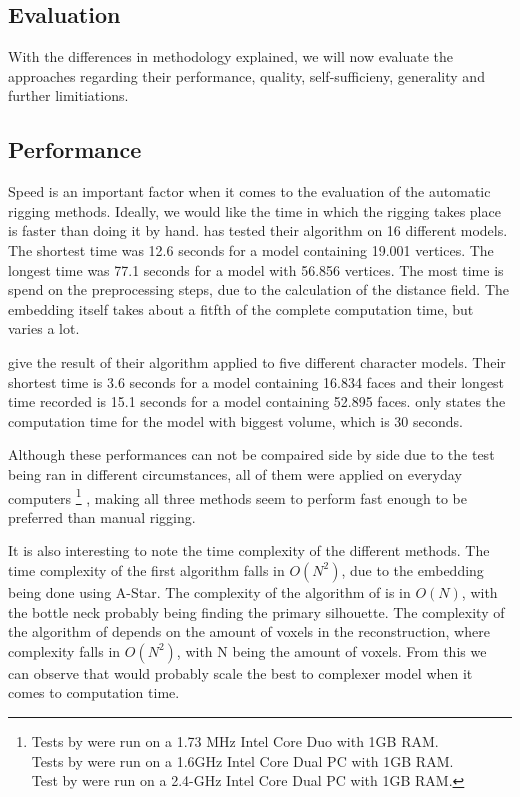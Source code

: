 \documentclass{article}
\begin{document}



\subsection{Evaluation}
With the differences in methodology explained, we will now evaluate the
approaches regarding their performance, quality, self-sufficieny, generality and
further limitiations.

\subsection{Performance}
Speed is an important factor when it comes to the evaluation of the automatic rigging
methods. Ideally, we would like the time in which the rigging takes place is
faster than doing it by hand. \citep{paper1} has tested their algorithm on 16
different models. The shortest time was 12.6 seconds for a model containing 19.001
vertices. The longest time was 77.1 seconds for a model with 56.856 vertices.
The most time is spend on the preprocessing steps, due to the calculation of the
distance field. The embedding itself takes about a fitfth of the complete
computation time, but varies a lot.

\citep{paper2} give the result of their algorithm applied to five different
character models. Their shortest time is 3.6 seconds for a model containing
16.834 faces and their longest time recorded is 15.1 seconds for a model
containing 52.895 faces.
\citep{paper3} only states the computation time for the model with biggest
volume, which is 30 seconds.

Although these performances can not be compaired side by side due to the test
being ran in different circumstances, all of them were applied on everyday
computers \footnote{Tests by \citep{paper1} were run on a 1.73 MHz Intel Core Duo
    with 1GB RAM.\\ Tests by \citep{paper2} were run on a 1.6GHz Intel Core Dual PC
    with 1GB RAM.\\
Test by \citep{paper3} were run on a 2.4-GHz Intel Core Dual PC with 1GB RAM.}
, making all three methods seem to perform fast enough to be preferred than
manual rigging. 

It is also interesting to note the time complexity of the different methods.
The time complexity of the first algorithm falls in $O(N^2)$, due to the
embedding being done using A-Star.
The complexity of the algorithm of \citep{paper2} is in $O(N)$, with the bottle
neck probably being finding the primary silhouette.
The complexity of the algorithm of \citep{paper3} depends on the amount of
voxels in the reconstruction, where complexity falls in $O(N^2)$, with N being the
amount of voxels.
From this we can observe that \citep{paper2} would probably scale the best to
complexer model when it comes to computation time.
\end{document}
